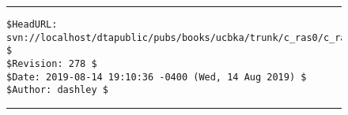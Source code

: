 \vfill
\noindent\begin{figure}[!b]
\noindent\rule[-0.25in]{\textwidth}{1pt}
\begin{tiny}
\begin{verbatim}
$HeadURL: svn://localhost/dtapublic/pubs/books/ucbka/trunk/c_ras0/c_ras0.tex $
$Revision: 278 $
$Date: 2019-08-14 19:10:36 -0400 (Wed, 14 Aug 2019) $
$Author: dashley $
\end{verbatim}
\end{tiny}
\noindent\rule[0.25in]{\textwidth}{1pt}
\end{figure}

%
